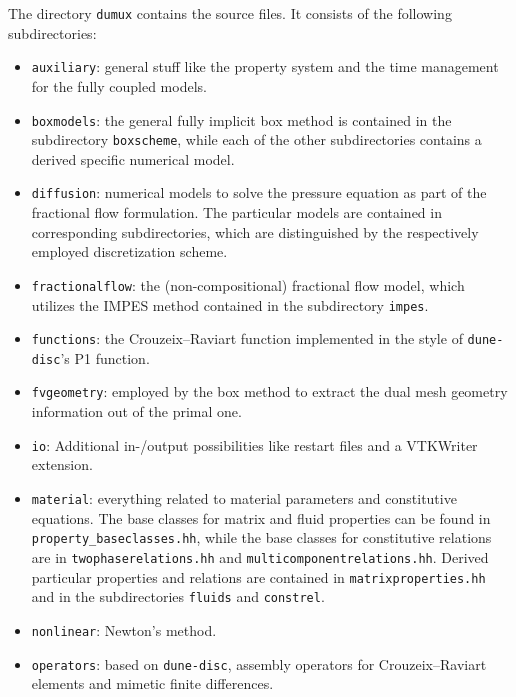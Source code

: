 The directory \texttt{dumux} contains the \Dumux source files. It consists 
of the following subdirectories: 
\begin{itemize} 
\item \texttt{auxiliary}: 
general stuff like the property system and the time management for the 
fully coupled models. 

\item \texttt{boxmodels}:
the general fully implicit box method is contained in the subdirectory 
\texttt{boxscheme}, while each of the other subdirectories contains 
a derived specific numerical model. 

\item \texttt{diffusion}: numerical models to solve the pressure equation 
as part of the fractional flow formulation. The particular models are contained 
in corresponding subdirectories, which are distinguished by the respectively employed 
discretization scheme. 

\item \texttt{fractionalflow}:
the (non-compositional) fractional flow model, which utilizes the IMPES method 
contained in the subdirectory \texttt{impes}.

\item \texttt{functions}:
the Crouzeix--Raviart function implemented in the style of \texttt{dune-disc}'s P1 function. 

\item \texttt{fvgeometry}:
employed by the box method to extract the dual mesh geometry information out of the 
primal one. 

\item \texttt{io}: Additional in-/output possibilities like restart files 
and a VTKWriter extension. 

\item \texttt{material}: everything related to material parameters and 
constitutive equations. The base classes for matrix and fluid properties 
can be found in \texttt{property\_baseclasses.hh}, while the base classes 
for constitutive relations are in \texttt{twophaserelations.hh} and \texttt{multicomponentrelations.hh}.
Derived particular properties and relations are contained in 
\texttt{matrixproperties.hh} and in the subdirectories 
\texttt{fluids} and \texttt{constrel}. 


\item \texttt{nonlinear}: Newton's method.


\item \texttt{operators}: based on \texttt{dune-disc}, assembly operators for Crouzeix--Raviart 
elements and mimetic finite differences. 



\end{itemize}
